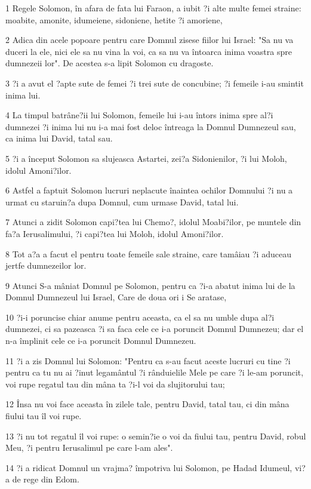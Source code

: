 \par 1 Regele Solomon, în afara de fata lui Faraon, a iubit ?i alte multe femei straine: moabite, amonite, idumeiene, sidoniene, hetite ?i amoriene,
\par 2 Adica din acele popoare pentru care Domnul zisese fiilor lui Israel: "Sa nu va duceri la ele, nici ele sa nu vina la voi, ca sa nu va întoarca inima voastra spre dumnezeii lor". De acestea s-a lipit Solomon cu dragoste.
\par 3 ?i a avut el ?apte sute de femei ?i trei sute de concubine; ?i femeile i-au smintit inima lui.
\par 4 La timpul batrâne?ii lui Solomon, femeile lui i-au întors inima spre al?i dumnezei ?i inima lui nu i-a mai fost deloc întreaga la Domnul Dumnezeul sau, ca inima lui David, tatal sau.
\par 5 ?i a început Solomon sa slujeasca Astartei, zei?a Sidonienilor, ?i lui Moloh, idolul Amoni?ilor.
\par 6 Astfel a faptuit Solomon lucruri neplacute înaintea ochilor Domnului ?i nu a urmat cu staruin?a dupa Domnul, cum urmase David, tatal lui.
\par 7 Atunci a zidit Solomon capi?tea lui Chemo?, idolul Moabi?ilor, pe muntele din fa?a Ierusalimului, ?i capi?tea lui Moloh, idolul Amoni?ilor.
\par 8 Tot a?a a facut el pentru toate femeile sale straine, care tamâiau ?i aduceau jertfe dumnezeilor lor.
\par 9 Atunci S-a mâniat Domnul pe Solomon, pentru ca ?i-a abatut inima lui de la Domnul Dumnezeul lui Israel, Care de doua ori i Se aratase,
\par 10 ?i-i poruncise chiar anume pentru aceasta, ca el sa nu umble dupa al?i dumnezei, ci sa pazeasca ?i sa faca cele ce i-a poruncit Domnul Dumnezeu; dar el n-a împlinit cele ce i-a poruncit Domnul Dumnezeu.
\par 11 ?i a zis Domnul lui Solomon: "Pentru ca s-au facut aceste lucruri cu tine ?i pentru ca tu nu ai ?inut legamântul ?i rânduielile Mele pe care ?i le-am poruncit, voi rupe regatul tau din mâna ta ?i-l voi da slujitorului tau;
\par 12 Însa nu voi face aceasta în zilele tale, pentru David, tatal tau, ci din mâna fiului tau îl voi rupe.
\par 13 ?i nu tot regatul îl voi rupe: o semin?ie o voi da fiului tau, pentru David, robul Meu, ?i pentru Ierusalimul pe care l-am ales".
\par 14 ?i a ridicat Domnul un vrajma? împotriva lui Solomon, pe Hadad Idumeul, vi?a de rege din Edom.
